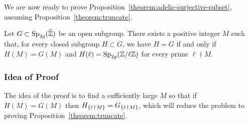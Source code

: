 We are now ready to prove Proposition~\ref{theorem:adelic-surjective-subset},
assuming Proposition~\ref{theorem:truncate}.
\begin{proposition}
		\label{theorem:adelic-surjective-subset}
		Let $G \subset \operatorname{Sp}_{2g}(\widehat{{\mathbb Z}})$ be an open subgroup. There exists a positive integer $M$ such that, for every closed subgroup $H \subset G$, we have $H = G$ if and only if $H(M) = G(M)$ and $H(\ell) = \operatorname{Sp}_{2g}({\mathbb Z} / \ell \mathbb Z)$ for every prime $\ell \nmid M$.
	\end{proposition}
\subsubsection*{Idea of Proof}
The idea of the proof is to find a sufficiently large $M$
so that if $H(M) = G(M)$ then $H_{\{\ell \hspace{.05cm}\nmid \hspace{.05cm}M\}} = G_{\{\ell \hspace{.05cm} \nmid\hspace{.05cm} M\}}$,
which will reduce the problem to proving
Proposition~\ref{theorem:truncate}.

